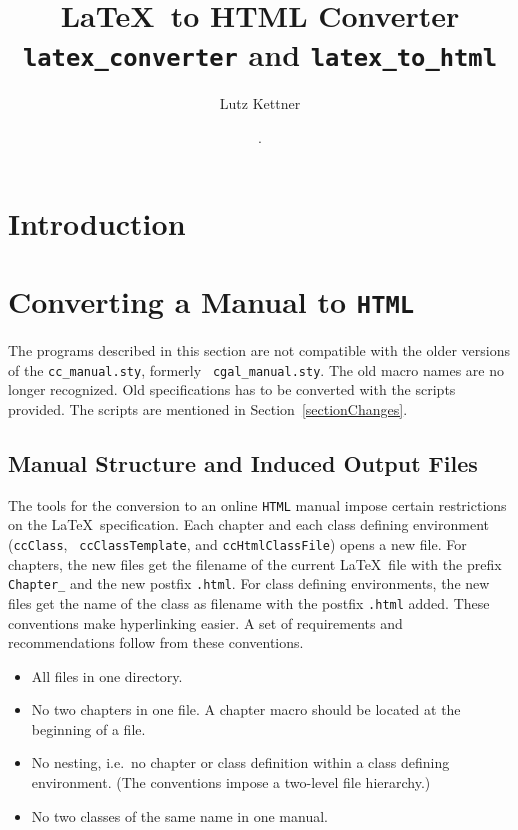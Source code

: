 \documentclass[12pt]{article}
\title{\LaTeX\ to HTML Converter\\
       {\tt latex\_converter} and {\tt latex\_to\_html}}
\author{Lutz Kettner}
\date{\lcRevision. \lcDate}
\makeatletter
\newcommand{\TTindex}[1]{\index{#1@{\tt #1}}}
\makeatother
\begin{document}
\maketitle

\tableofcontents

\section{Introduction}



\section{Converting a Manual to {\tt HTML}}
\label{sectionHTML}
\TTindex{HTML}

The programs described in this section are not compatible with the
older versions of the {\tt cc\_manual.sty}, formerly {\tt
  cgal\_manual.sty}. The old macro names are no longer recognized. Old
specifications has to be converted with the scripts provided. The
scripts are mentioned in Section~\ref{sectionChanges}.

\subsection{Manual Structure and Induced Output Files}

 The tools for the conversion to an online {\tt HTML} manual
impose certain restrictions on the \LaTeX\ specification. Each chapter
and each class defining environment ({\tt ccClass}, {\tt
  ccClassTemplate}, and {\tt ccHtmlClassFile}) opens a new file. For
chapters, the new files get the filename of the current \LaTeX\ file
with the prefix {\tt Chapter\_} and the new postfix {\tt .html}. For
class defining environments, the new files get the name of the class
as filename with the postfix {\tt .html} added. These conventions make
hyperlinking easier.  A set of requirements and recommendations follow
from these conventions.

\begin{itemize}
  \item
    All files in one directory.
  \item
    No two chapters in one file. A chapter macro should be located at
    the beginning of a file.
  \item
    No nesting, i.e.\ no chapter or class definition within a class
    defining environment. (The conventions impose a two-level file
    hierarchy.)
  \item
    No two classes of the same name in one manual.
\end{itemize}
\end{document}
